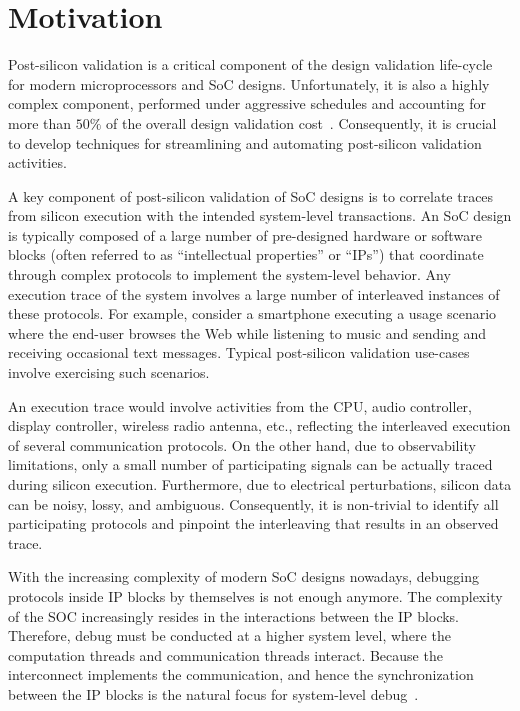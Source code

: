 \documentclass[12pt,frontmatter,copyright,thesis]{usfmanus}
\begin{document}
\section{Motivation}

Post-silicon validation is a critical
component of the design validation life-cycle for modern
microprocessors and SoC designs.  Unfortunately, it is also
a highly complex component, performed under aggressive
schedules and accounting for more than $50\%$ of the overall
design validation cost~\cite{Patra2007}.  Consequently, it
is crucial to develop techniques for streamlining and
automating post-silicon validation activities.



A key component of post-silicon validation of SoC designs is
to correlate traces from silicon execution with the intended
system-level transactions.  An SoC design is typically
composed of a large number of pre-designed hardware or
software blocks (often referred to as ``intellectual
properties'' or ``IPs'') that coordinate through complex
protocols to implement the system-level behavior.  Any
execution trace of the system involves a large number of
interleaved instances of these protocols.  For example,
consider a smartphone executing a usage scenario where the
end-user browses the Web while listening to music and
sending and receiving occasional text messages.  Typical
post-silicon validation use-cases involve exercising such
scenarios. 

 An execution trace would involve activities from
the CPU, audio controller, display controller, wireless
radio antenna, etc., reflecting the interleaved execution of
several communication protocols.  On the other hand, due to
observability limitations, only a small number of
participating signals can be actually traced during silicon
execution.  Furthermore, due to electrical perturbations,
silicon data can be noisy, lossy, and ambiguous.
Consequently, it is non-trivial to identify all
participating protocols and pinpoint the interleaving that
results in an observed trace.

With the increasing complexity of modern SoC designs nowadays, 
debugging protocols inside IP
blocks by themselves is not enough anymore. The complexity
of the SOC increasingly resides in the interactions between
the IP blocks. 
Therefore, debug must be conducted
at a higher system level, where the computation threads
and communication threads interact.
 Because the interconnect
implements the communication, and hence the synchronization
between the IP blocks is the natural focus for system-level
debug~\cite{Goossens2007NOCS}.
\end{document}
